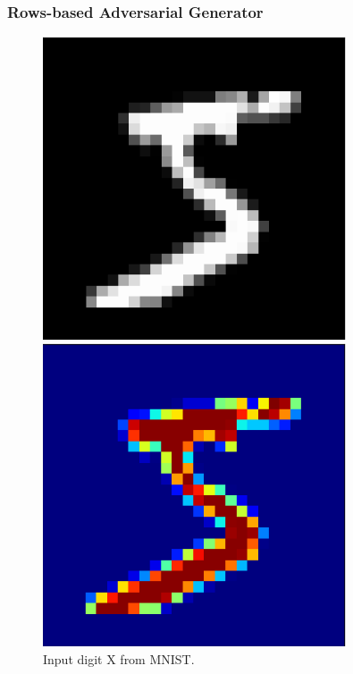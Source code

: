 \documentclass{beamer}
\begin{document}
\begin{frame}
	\frametitle{Rows-based Adversarial Generator}

\begin{figure}[H]
	\begin{minipage}[t]{0.3\linewidth}
		\centering
		\includegraphics[width=0.8\textwidth]{img/advrows/5.png}
		\caption{\small Input digit X from MNIST.}
	\end{minipage}        
	\hspace{.1cm}
	\begin{minipage}[t]{0.3\linewidth}
		\centering
		\includegraphics[width=0.8\textwidth]{img/advrows/5jet.png}

\end{minipage}
\end{figure}
\end{frame}
\end{document}
